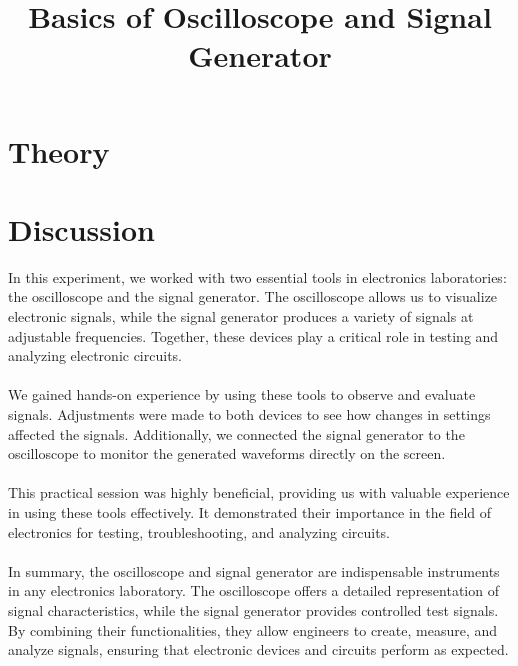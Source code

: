 \documentclass[12pt]{article}
\title{Basics of Oscilloscope and Signal Generator}
\author{}
\date{}
\begin{document}


\pagebreak

\tableofcontents

\pagebreak
{}
\maketitle

\section*{Theory}



\section*{Discussion}
In this experiment, we worked with two essential tools in electronics laboratories: the oscilloscope and the signal generator. The oscilloscope allows us to visualize electronic signals, while the signal generator produces a variety of signals at adjustable frequencies. Together, these devices play a critical role in testing and analyzing electronic circuits.\\\\
We gained hands-on experience by using these tools to observe and evaluate signals. Adjustments were made to both devices to see how changes in settings affected the signals. Additionally, we connected the signal generator to the oscilloscope to monitor the generated waveforms directly on the screen.\\\\
This practical session was highly beneficial, providing us with valuable experience in using these tools effectively. It demonstrated their importance in the field of electronics for testing, troubleshooting, and analyzing circuits.\\\\
In summary, the oscilloscope and signal generator are indispensable instruments in any electronics laboratory. The oscilloscope offers a detailed representation of signal characteristics, while the signal generator provides controlled test signals. By combining their functionalities, they allow engineers to create, measure, and analyze signals, ensuring that electronic devices and circuits perform as expected.
\end{document}
